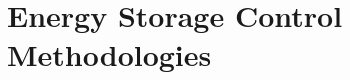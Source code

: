 \section{Energy Storage Control Methodologies}
\label{ch-review:sec:energy-storage-control-methodologies}

%
%
%
%
%
%
%




%
%

%
